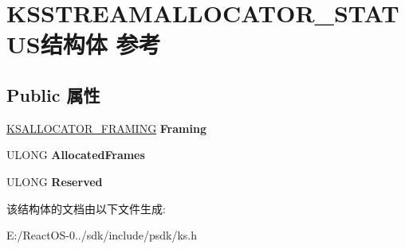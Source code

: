 \hypertarget{struct_k_s_s_t_r_e_a_m_a_l_l_o_c_a_t_o_r___s_t_a_t_u_s}{}\section{K\+S\+S\+T\+R\+E\+A\+M\+A\+L\+L\+O\+C\+A\+T\+O\+R\+\_\+\+S\+T\+A\+T\+U\+S结构体 参考}
\label{struct_k_s_s_t_r_e_a_m_a_l_l_o_c_a_t_o_r___s_t_a_t_u_s}
\subsection*{Public 属性}
\begin{DoxyCompactItemize}
\item 
\mbox{\label{struct_k_s_s_t_r_e_a_m_a_l_l_o_c_a_t_o_r___s_t_a_t_u_s_aec69a994d32bf64ab192e00ad824ab0b}} 
\hyperlink{struct_k_s_a_l_l_o_c_a_t_o_r___f_r_a_m_i_n_g}{K\+S\+A\+L\+L\+O\+C\+A\+T\+O\+R\+\_\+\+F\+R\+A\+M\+I\+NG} {\bfseries Framing}
\item 
\mbox{\label{struct_k_s_s_t_r_e_a_m_a_l_l_o_c_a_t_o_r___s_t_a_t_u_s_a25dfbac1e77a72a8d630ad57ac0bc673}} 
U\+L\+O\+NG {\bfseries Allocated\+Frames}
\item 
\mbox{\label{struct_k_s_s_t_r_e_a_m_a_l_l_o_c_a_t_o_r___s_t_a_t_u_s_a808a603d84c6a9df1778fffd3c7478f2}} 
U\+L\+O\+NG {\bfseries Reserved}
\end{DoxyCompactItemize}


该结构体的文档由以下文件生成\+:\begin{DoxyCompactItemize}
\item 
E\+:/\+React\+O\+S-\/0../sdk/include/psdk/ks.\+h\end{DoxyCompactItemize}
